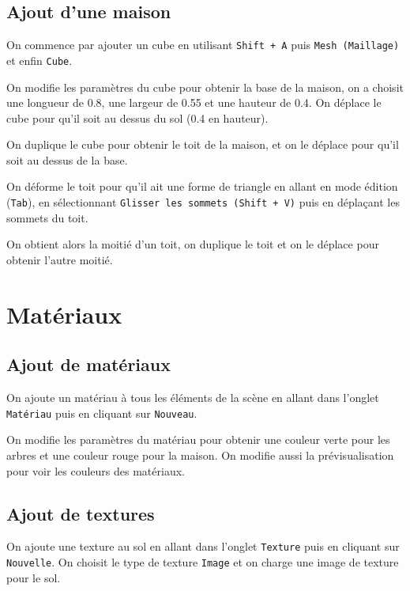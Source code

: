 \documentclass[french,a4paper,10pt]{article}
\begin{document}
    \subsection{Ajout d'une maison}\label{subsec:1.4}

    On commence par ajouter un cube en utilisant \texttt{Shift + A} puis \texttt{Mesh (Maillage)} et enfin
    \texttt{Cube}.

    On modifie les paramètres du cube pour obtenir la base de la maison, on a choisit une longueur de 0.8, une largeur de
    0.55 et une hauteur de 0.4. On déplace le cube pour qu'il soit au dessus du sol (0.4 en hauteur).

    On duplique le cube pour obtenir le toit de la maison, et on le déplace pour qu'il soit au dessus de la base.

    On déforme le toit pour qu'il ait une forme de triangle en allant en mode édition (\texttt{Tab}), en sélectionnant
    \texttt{Glisser les sommets (Shift + V)} puis en déplaçant les sommets du toit.

    On obtient alors la moitié d'un toit, on duplique le toit et on le déplace pour obtenir l'autre moitié.

    \section{Matériaux}\label{sec:2}

    \subsection{Ajout de matériaux}\label{subsec:2.1}

    On ajoute un matériau à tous les éléments de la scène en allant dans l'onglet \texttt{Matériau} puis en cliquant sur
    \texttt{Nouveau}.

    On modifie les paramètres du matériau pour obtenir une couleur verte pour les arbres et une couleur rouge pour la
    maison. On modifie aussi la prévisualisation pour voir les couleurs des matériaux.

    \subsection{Ajout de textures}\label{subsec:2.2}

    On ajoute une texture au sol en allant dans l'onglet \texttt{Texture} puis en cliquant sur \texttt{Nouvelle}.
    On choisit le type de texture \texttt{Image} et on charge une image de texture pour le sol.
\end{document}
